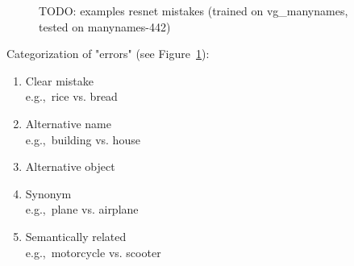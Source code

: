 \begin{figure}
	\caption{TODO: examples resnet mistakes (trained on vg\_manynames, tested on manynames-442)\label{fig:mistakes}}
\end{figure}

Categorization of "errors" (see Figure~\ref{fig:mistakes}):
\begin{enumerate}
	\item Clear mistake \\
	e.g.,\ rice vs. bread
	\item Alternative name\\
	e.g.,\ building vs. house
	\item Alternative object 
	\item Synonym\\
	e.g.,\ plane vs. airplane
	\item Semantically related\\
	e.g.,\  motorcycle vs. scooter
\end{enumerate}

